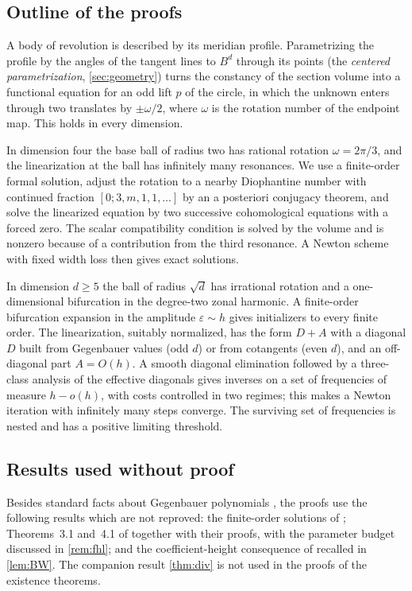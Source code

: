 \documentclass[11pt]{amsart}
\numberwithin{equation}{section}
\theoremstyle{definition}
\theoremstyle{remark}
\newcommand{\eps}{\varepsilon}
\begin{document}
\subsection{Outline of the proofs}
A body of revolution is described by its meridian profile. Parametrizing the profile by the angles of the tangent lines to $B^d$ through its points (the \emph{centered parametrization}, \cref{sec:geometry}) turns the constancy of the section volume into a functional equation for an odd lift $p$ of the circle, in which the unknown enters through two translates by $\pm\omega/2$, where $\omega$ is the rotation number of the endpoint map. This holds in every dimension.

In dimension four the base ball of radius two has rational rotation $\omega=2\pi/3$, and the linearization at the ball has infinitely many resonances. We use a finite-order formal solution, adjust the rotation to a nearby Diophantine number with continued fraction $[0;3,m,1,1,\dots]$ by an a posteriori conjugacy theorem, and solve the linearized equation by two successive cohomological equations with a forced zero. The scalar compatibility condition is solved by the volume and is nonzero because of a contribution from the third resonance. A Newton scheme with fixed width loss then gives exact solutions.

In dimension $d\ge5$ the ball of radius $\sqrt d$ has irrational rotation and a one-dimensional bifurcation in the degree-two zonal harmonic. A finite-order bifurcation expansion in the amplitude $\eps\sim h$ gives initializers to every finite order. The linearization, suitably normalized, has the form $D+A$ with a diagonal $D$ built from Gegenbauer values (odd $d$) or from cotangents (even $d$), and an off-diagonal part $A=O(h)$. A smooth diagonal elimination followed by a three-class analysis of the effective diagonals gives inverses on a set of frequencies of measure $h-o(h)$, with costs controlled in two regimes; this makes a Newton iteration with infinitely many steps converge. The surviving set of frequencies is nested and has a positive limiting threshold.

\subsection{Results used without proof}
Besides standard facts about Gegenbauer polynomials \cite{DLMF}, the proofs use the following results which are not reproved: the finite-order solutions of \cite{Had}; Theorems~3.1 and~4.1 of \cite{FHL} together with their proofs, with the parameter budget discussed in \cref{rem:fhl}; and the coefficient-height consequence of \cite{BW} recalled in \cref{lem:BW}. The companion result \cref{thm:div} is not used in the proofs of the existence theorems.
\end{document}
